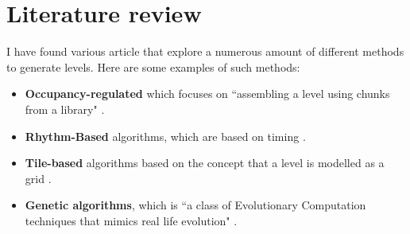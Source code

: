 \documentclass{ueacmpstyle}
\begin{document}
\section{Literature review}
I have found various article that explore a numerous amount of different methods to generate levels. Here are some examples of such methods:
\begin{itemize}
\item {\bf Occupancy-regulated} which focuses on ``assembling a level using chunks from a library" \citep{DBLP:conf/cig/MawhorterM10}.
\item {\bf Rhythm-Based} algorithms, which are based on timing \citep{DBLP:journals/tciaig/SmithWMTMC11}.
\item {\bf Tile-based} algorithms based on the concept that a level is modelled as a grid \citep{DBLP:conf/cec/McGuinnessA11}.
\item {\bf Genetic algorithms}, which is ``a class of Evolutionary Computation techniques that mimics real life evolution" \citep{DBLP:conf/ACMace/MouratoSB11}.
\end{itemize}


\end{document}
